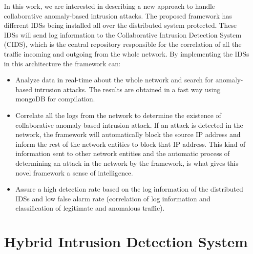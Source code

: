 \documentclass[conference]{IEEEtran}
\begin{document}
In this work, we are interested in describing a new approach to handle collaborative anomaly-based intrusion attacks. The proposed framework has different IDSs being installed all over the distributed system protected.  These IDSs will send log information to the Collaborative Intrusion Detection System (CIDS), which is the central repository responsible for the correlation of all the traffic incoming and outgoing from the whole network. By implementing the IDSs in this architecture the framework can:
\begin{itemize}
\item Analyze data in real-time about the whole network and search for anomaly-based intrusion attacks. The results are obtained in a fast way using mongoDB \cite{mongoDB} for compilation.
\item Correlate all the logs from the network to determine the existence of collaborative anomaly-based intrusion attack. If an attack is detected in the network, the framework will automatically block the source IP address and inform the rest of the network entities to block that IP address. This kind of information sent to other network entities and the automatic process of determining an attack in the network by the framework, is what gives this novel framework a sense of intelligence. 
\item Assure a high detection rate based on the log information of the distributed IDSs and low false alarm rate (correlation of log information and classification of legitimate and anomalous traffic).
\end{itemize} 

\section{Hybrid Intrusion Detection System}
\label{framework}
\end{document}
